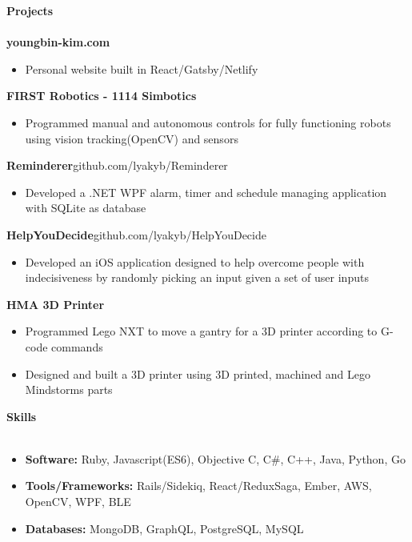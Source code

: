 \documentclass[a4paper]{article}
\newcommand{\lineunder} {
    \vspace{-8pt} \\
    \hspace{-18pt} \hrulefill \\
}
\newcommand{\header} [1] {
    {\hspace{-18pt}\vspace*{6pt} \textcolor{headerGray}{\textbf{\large{#1}}}}
    \vspace{-6pt} \lineunder
}
\begin{document}
\header{Projects}
{\textbf{\normalsize youngbin-kim.com}}\\
\vspace{-1.5mm}
\begin{itemize}[leftmargin= *]\itemsep -0.5pt
	\item Personal website built in React/Gatsby/Netlify
\end{itemize}
{\textbf{\normalsize FIRST Robotics - 1114 Simbotics}}\\
\vspace{-1.5mm}
\begin{itemize}[leftmargin=* ]\itemsep -0.5pt
	\item Programmed manual and autonomous controls for fully functioning robots using vision tracking(OpenCV) and sensors
\end{itemize}
{\textbf{\normalsize Reminderer}}\hfill \textcolor{dateGray}{github.com/lyakyb/Reminderer}\\
\vspace{-1.5mm}
\begin{itemize}[leftmargin=* ]\itemsep -0.5pt
	\item Developed a .NET WPF alarm, timer and schedule managing application with SQLite as database
\end{itemize}
{\textbf{\normalsize HelpYouDecide}}\hfill \textcolor{dateGray}{github.com/lyakyb/HelpYouDecide}\\
\vspace{-1.5mm}
\begin{itemize}[leftmargin=* ]\itemsep -0.5pt
	\item Developed an iOS application designed to help overcome people with indecisiveness by randomly picking an input given a set of user inputs
\end{itemize}
{\textbf{\normalsize HMA 3D Printer}}\\
\vspace{-1.5mm}
\begin{itemize}[leftmargin=* ]\itemsep -0.5pt
	\item Programmed Lego NXT to move a gantry for a 3D printer according to G-code commands
	\item Designed and built a 3D printer using 3D printed, machined and Lego Mindstorms parts
\end{itemize}
\vspace{2mm}

\header{Skills}
\vspace{-2.5mm}
\begin{itemize}[leftmargin=*]\itemsep -0.5pt
	\item \textbf{Software: } Ruby, Javascript(ES6), Objective C, C\#, C++, Java, Python, Go\\
	\item \textbf{Tools/Frameworks: } Rails/Sidekiq, React/ReduxSaga, Ember, AWS, OpenCV, WPF, BLE\\
	\item \textbf{Databases: } MongoDB, GraphQL, PostgreSQL, MySQL
\end{itemize}
\end{document}
